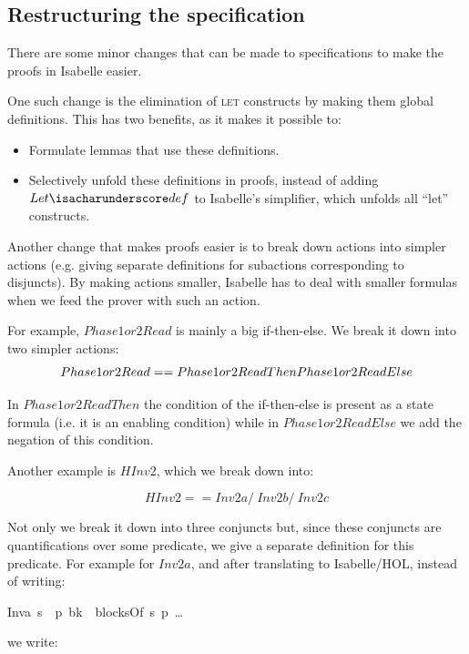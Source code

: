 \subsection{Restructuring the specification}

There are some minor changes that can be made to specifications to
make the proofs in Isabelle easier. 

One such change is the elimination of \textsc{let} constructs by making
them global definitions. This has two benefits, as it makes it possible
to:

\begin{itemize}
\item Formulate lemmas that use these definitions.
\item Selectively unfold these definitions in proofs, instead of adding
\mbox{$Let\isacharunderscore def$} to Isabelle's simplifier, which unfolds all {}``let''
constructs.
\end{itemize}
Another change that makes proofs easier is to break down actions into
simpler actions (e.g. giving separate definitions for subactions corresponding
to disjuncts). By making actions smaller, Isabelle has to deal with
smaller formulas when we feed the prover with such an action.

\tla
For example, $Phase1or2Read$ is mainly a big if-then-else. We break
it down into two simpler actions: \[
Phase1or2Read == Phase1or2ReadThen \/ Phase1or2ReadElse\]


\noindent In $Phase1or2ReadThen$ the condition of the if-then-else
is present as a state formula (i.e. it is an enabling condition) while
in $Phase1or2ReadElse$ we add the negation of this condition.

Another example is $HInv2$, which we break down into:

\[
HInv2 == Inv2a /\ Inv2b /\ Inv2c\]

\notla

Not only we break it down into three conjuncts but, since these
conjuncts are quantifications over some predicate, we give a separate
definition for this predicate. For example for $Inv2a$, and after
translating to Isabelle/HOL, instead of writing:

\medskip
\begin{isabellebody}
Inv{}a\ s\ {\isasymequiv}\
  {\isasymforall}p{\isachardot}\
{\isasymforall}bk\ {\isasymin}\ blocksOf\ s\
  p{\isachardot}\ \ldots 
\end{isabellebody}

\smallskip
\noindent we write:
\medskip


